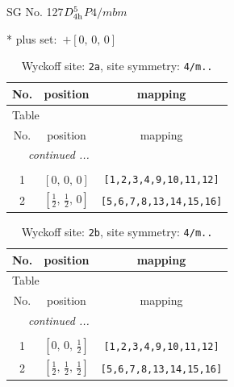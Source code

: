 \documentclass[fleqn,8pt]{jsarticle}
\begin{document}
\setcounter{MaxMatrixCols}{32}

\renewcommand{\tablename}{Table~}
\renewcommand{\figurename}{Figure~}
\begin{center}
\LARGE
SG No. 127\quad$D_{\rm 4h}^{5}$\quad$P4/mbm$\quad[ tetragonal ]
\end{center}
* plus set:\,\,\,$+\left[ 0,\, 0,\, 0 \right]$
\renewcommand{\arraystretch}{1.2}
\begin{longtable}{ccc}
\caption{Wyckoff site: {\tt 2a}, site symmetry: {\tt 4/m..}}
 \\
 \hline \hline
No. & position & mapping \\ \hline \endfirsthead

\multicolumn{2}{l}{\tablename\ \thetable{}} \\
 \hline \hline
No. & position & mapping \\ \hline \endhead

 \hline \hline
\multicolumn{2}{r}{\footnotesize\it continued ...} \\ \endfoot

 \hline \hline
\multicolumn{2}{r}{} \\ \endlastfoot

1 & $\left[ 0,\, 0,\, 0 \right]$ & {\tt [1,2,3,4,9,10,11,12]} \\ \hline
2 & $\left[ \frac{1}{2},\, \frac{1}{2},\, 0 \right]$ & {\tt [5,6,7,8,13,14,15,16]} \\
\end{longtable}
\renewcommand{\arraystretch}{1.2}
\begin{longtable}{ccc}
\caption{Wyckoff site: {\tt 2b}, site symmetry: {\tt 4/m..}}
 \\
 \hline \hline
No. & position & mapping \\ \hline \endfirsthead

\multicolumn{2}{l}{\tablename\ \thetable{}} \\
 \hline \hline
No. & position & mapping \\ \hline \endhead

 \hline \hline
\multicolumn{2}{r}{\footnotesize\it continued ...} \\ \endfoot

 \hline \hline
\multicolumn{2}{r}{} \\ \endlastfoot

1 & $\left[ 0,\, 0,\, \frac{1}{2} \right]$ & {\tt [1,2,3,4,9,10,11,12]} \\ \hline
2 & $\left[ \frac{1}{2},\, \frac{1}{2},\, \frac{1}{2} \right]$ & {\tt [5,6,7,8,13,14,15,16]} \\
\end{longtable}
\end{document}
